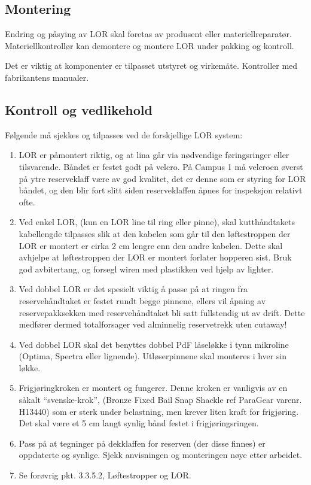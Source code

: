 \subsection{Montering}
Endring og påsying av LOR skal foretas av produsent eller materiellreparatør. Materiellkontrollør kan demontere og montere LOR under pakking og kontroll.

Det er viktig at komponenter er tilpasset utstyret og virkemåte. Kontroller med fabrikantens manualer.

\subsection{Kontroll og vedlikehold}
Følgende må sjekkes og tilpasses ved de forskjellige LOR system:
\begin{enumerate}
\item LOR er påmontert riktig, og at lina går via nødvendige føringsringer eller tilsvarende. Båndet er festet godt på velcro. På Campus 1 må velcroen øverst på ytre reserveklaff være av god kvalitet, det er denne som er styring for LOR båndet, og den blir fort slitt siden reserveklaffen åpnes for inspeksjon relativt ofte.
\item Ved enkel LOR, (kun en LOR line til ring eller pinne), skal kutthåndtakets kabellengde tilpasses slik at den kabelen som går til den løftestroppen der LOR er montert er cirka 2 cm lengre enn den andre kabelen. Dette skal avhjelpe at løftestroppen der LOR er montert forlater hopperen sist. Bruk god avbitertang, og forsegl wiren med plastikken ved hjelp av lighter.
\item Ved dobbel LOR er det spesielt viktig å passe på at ringen fra reservehåndtaket er festet rundt begge pinnene, ellers vil åpning av reservepakksekken med reservehåndtaket bli satt fullstendig ut av drift. Dette medfører dermed totalforsager ved alminnelig reservetrekk uten cutaway!
\item Ved dobbel LOR skal det benyttes dobbel PdF låseløkke i tynn mikroline (Optima, Spectra eller lignende). Utløserpinnene skal monteres i hver sin løkke.
\item Frigjøringkroken er montert og fungerer. Denne kroken er vanligvis av en såkalt ``svenske-krok'', (Bronze Fixed Bail Snap Shackle ref ParaGear varenr. H13440) som er sterk under belastning, men krever liten kraft for frigjøring. Det skal være et 5 cm langt synlig bånd festet i frigjøringsringen.
\item Pass på at tegninger på dekklaffen for reserven (der disse finnes) er oppdaterte og synlige. Sjekk anvisningen og monteringen nøye etter arbeidet.
\item Se forøvrig pkt. 3.3.5.2, Løftestropper og LOR.
\end{enumerate}

